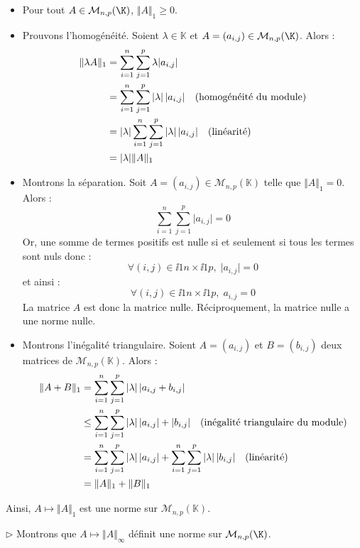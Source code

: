 \documentclass[a4paper,twoside,french,11pt]{VcCours}
\begin{document}
\begin{itemize}
\item Pour tout $A \in \mathcal{M}_{n,p}(\K)$, $\Vert A \Vert_{1} \geq 0$.
\item Prouvons l'homogénéité. Soient $\lambda \in \mathbb{K}$ et $A=(a_{i,j}) \in \mathcal{M}_{n,p}(\K)$. Alors :
\begin{align*}
\Vert \lambda A \Vert_1 & = \sum_{i = 1}^{n} \sum_{j = 1}^{p} \lambda \vert a_{i,j} \vert \\
& = \sum_{i = 1}^{n} \sum_{j = 1}^{p} \vert \lambda \vert \, \vert a_{i,j} \vert \quad \hbox{(homogénéité du module)} \\
& = \vert \lambda \vert  \sum_{i = 1}^{n} \sum_{j = 1}^{p} \vert \lambda \vert \, \vert a_{i,j} \vert  \quad \hbox{(linéarité)} \\
& = \vert \lambda \vert \Vert A \Vert_1 
\end{align*}
\item Montrons la séparation. Soit $A=(a_{i,j}) \in \mathcal{M}_{n,p}(\mathbb{K})$ telle que $\Vert A \Vert_1=0$. Alors :
$$ \sum_{i = 1}^{n} \sum_{j = 1}^{p} \vert a_{i,j} \vert =0$$
Or, une somme de termes positifs est nulle si et seulement si tous les termes sont nuls donc :
$$ \forall (i,j) \in \ii{1}{n} \times \ii{1}{p}, \; \vert a_{i,j} \vert =0$$
et ainsi :
$$  \forall (i,j) \in \ii{1}{n} \times \ii{1}{p}, \;  a_{i,j}  =0$$
La matrice $A$ est donc la matrice nulle. Réciproquement, la matrice nulle a une norme nulle.
\item Montrons l'inégalité triangulaire. Soient $A=(a_{i,j})$ et $B=(b_{i,j})$ deux matrices de $\mathcal{M}_{n,p}(\mathbb{K})$. Alors :
\begin{align*}
\Vert A+B \Vert_1 & =  \sum_{i = 1}^{n} \sum_{j = 1}^{p} \vert \lambda \vert \, \vert a_{i,j} +b_{i,j} \vert  \\
& \leq \sum_{i = 1}^{n} \sum_{j = 1}^{p} \vert \lambda \vert \, \vert a_{i,j} \vert + \vert b_{i,j} \vert \quad \hbox{(inégalité triangulaire du module)}  \\
& = \sum_{i = 1}^{n} \sum_{j = 1}^{p} \vert \lambda \vert \, \vert a_{i,j} \vert  + \sum_{i = 1}^{n} \sum_{j = 1}^{p} \vert \lambda \vert \,  \vert b_{i,j} \vert \quad \hbox{(linéarité)} \\
& = \Vert A \Vert_1 + \Vert B \Vert_1 
\end{align*}
\end{itemize}
Ainsi, $A \mapsto \Vert A \Vert_1$ est une norme sur $\mathcal{M}_{n,p}(\mathbb{K})$.


$\rhd$ Montrons que $A \mapsto \Vert A \Vert_{\infty}$ définit une norme sur $\mathcal{M}_{n,p}(\K)$.
\end{document}
